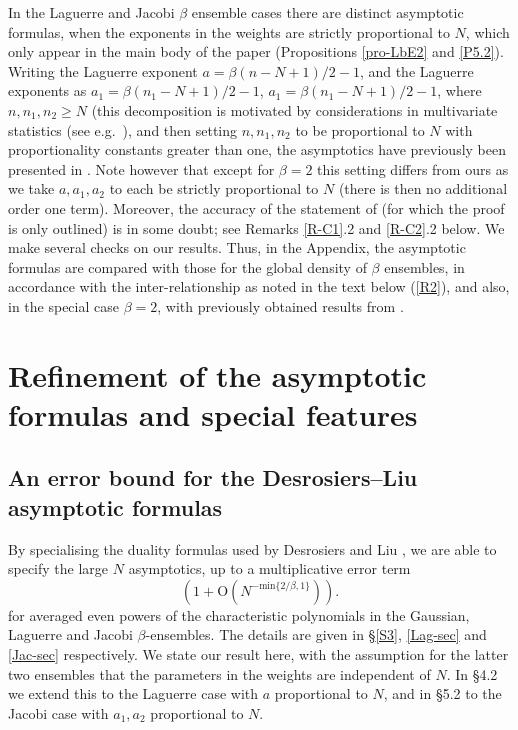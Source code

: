 \documentclass[11pt,a4paper]{article}
\numberwithin{equation}{section} %
\theoremstyle{plain}
\theoremstyle{definition}
\numberwithin{prop}{section}
\numberwithin{cor}{section}
\numberwithin{remark}{section}
\begin{document}
In the
Laguerre and Jacobi $\beta$ ensemble cases 
there are distinct asymptotic formulas, when the exponents in the weights are strictly proportional to $N$, which only appear in the main body of the paper (Propositions \ref{pro-LbE2}
and \ref{P5.2}). Writing the Laguerre exponent $a=\beta(n-N+1)/2 - 1$, and the Laguerre exponents as $a_1 = \beta (n_1 - N+1)/2 -1$, $a_1 = \beta (n_1 - N+1)/2 -1$,
where $n,n_1,n_2 \ge N$ (this decomposition is motivated by considerations in multivariate statistics
(see e.g.~\cite[Props.~3.22 and 3.6.1]{Fo10}), and then setting $n,n_1,n_2$ to be proportional to $N$ with proportionality constants greater than one, the asymptotics have previously been presented in \cite[Th.~4.3]{DL14}. Note however that except for $\beta = 2$ this setting differs from ours as we take $a,a_1,a_2$ to each be strictly proportional to $N$ (there is then no additional order one term). Moreover, the accuracy of the statement of \cite[Th.~4.3]{DL14} (for which the proof is only outlined) is in some doubt; see Remarks \ref{R-C1}.2 and \ref{R-C2}.2 below.
We make several checks on our results.
Thus, in the Appendix, the asymptotic formulas are compared with those for the global density of $\beta$ ensembles, in accordance with the inter-relationship as noted in the text below (\ref{R2}), and also, in the special case $\beta = 2$, with previously obtained results from \cite{CG21}.


  


\section{Refinement of the asymptotic formulas and special features}\label{S2}

\subsection{An error bound for the  Desrosiers--Liu asymptotic formulas}
By specialising the duality formulas used by Desrosiers and Liu \cite{DL14},
we are able to specify
the large $N$ asymptotics, up to a multiplicative error term
\begin{equation}\label{x1}
\left(1+\mathrm{O}\left( N^{-\mathrm{min}\{2/\beta,1\}}\right)\right).
\end{equation} 
 for averaged even powers of the  characteristic polynomials
in the Gaussian, Laguerre and Jacobi $\beta$-ensembles. The details are given in \S \ref{S3}, \ref{Lag-sec} and \ref{Jac-sec} respectively.
We state our result here, with the assumption for the latter two ensembles that the parameters in the weights are independent of $N$. In \S 4.2 we extend this to the Laguerre case with $a$ proportional to $N$, and in \S 5.2 to the Jacobi case with $a_1, a_2$ proportional to $N$.
\end{document}
